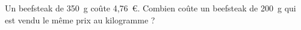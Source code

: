 Un beefsteak de 350~g coûte 4,76~\textgreek{\euro}. Combien coûte
 un beefsteak de 200~g qui est vendu le même prix au kilogramme ?